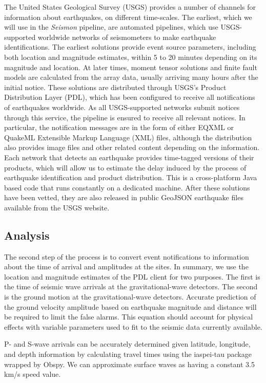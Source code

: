 \documentclass[twocolumn, aps, superscriptaddress]{revtex4}
\begin{document}
The United States Geological Survey (USGS) provides a number of channels for information about earthquakes, on different time-scales. The earliest, which we will use in the \emph{Seismon} pipeline, are automated pipelines, which use USGS-supported worldwide networks of seismometers to make earthquake identifications. The earliest solutions provide event source parameters, including both location and magnitude estimates, within 5 to 20 minutes depending on its magnitude and location. At later times, moment tensor solutions and finite fault models are calculated from the array data, usually arriving many hours after the initial notice. These solutions are distributed through USGS's Product Distribution Layer (PDL), which has been configured to receive all notifications of earthquakes worldwide. As all USGS-supported networks submit notices through this service, the pipeline is ensured to receive all relevant notices.
In particular, the notification messages are in the form of either EQXML or QuakeML Extensible Markup Language (XML) files, although the distribution also provides image files and other related content depending on the information. Each network that detects an earthquake provides time-tagged versions of their products, which will allow us to estimate the delay induced by the process of earthquake identification and product distribution. This is a cross-platform Java based code that runs constantly on a dedicated machine. 
After these solutions have been vetted, they are also released in public GeoJSON earthquake files available from the USGS website.

\subsection{Analysis}
\label{subsec:analysis}

The second step of the process is to convert event notifications to information about the time of arrival and amplitudes at the sites.
In summary, we use the location and magnitude estimates of the PDL client for two purposes. 
The first is the time of seismic wave arrivals at the gravitational-wave detectors.
The second is the ground motion at the gravitational-wave detectors.
Accurate prediction of the ground velocity amplitude based on earthquake magnitude and distance will be required to limit the false alarms. 
This equation should account for physical effects with variable parameters used to fit to the seismic data currently available.

P- and S-wave arrivals can be accurately determined given latitude, longitude, and depth information by calculating travel times using the iaspei-tau package \cite{Snoke2009} wrapped by Obspy. We can approximate surface waves as having a constant 3.5\,km/s speed value. 
\end{document}
